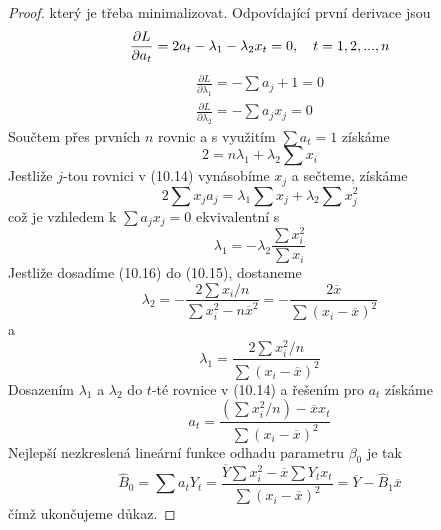 \begin{proof}
který je třeba minimalizovat. Odpovídající první derivace jsou
\begin{equation}
\frac{\partial L}{\partial a_t} = 2a_t - \lambda_1 - \lambda_2 x_t = 0, ~~~ t = 1, 2, ..., n\\
\end{equation}
\begin{gather*}
\frac{\partial L}{\partial \lambda_1} = - \sum a_j + 1 = 0\\
\frac{\partial L}{\partial \lambda_2} = - \sum a_j x_j = 0
\end{gather*}
Součtem přes prvních $n$ rovnic a s využitím $\sum a_t = 1$ získáme
\begin{equation}
2 = n \lambda_1 + \lambda_2 \sum x_i
\end{equation}
Jestliže $j$-tou rovnici v (10.14) vynásobíme $x_j$ a sečteme, získáme
\begin{equation*}
2 \sum x_j a_j = \lambda_1 \sum x_j + \lambda_2 \sum x_j^2
\end{equation*}
což je vzhledem k $\sum a_j x_j = 0$ ekvivalentní s
\begin{equation}
\lambda_1 = - \lambda_2 \frac{\sum x_i^2}{\sum x_i}
\end{equation}
Jestliže dosadíme (10.16) do (10.15), dostaneme
\begin{equation*}
\lambda_2 = - \frac{2 \sum x_i / n}{\sum x_i^2 - n \overline{x}^2} = - \frac{2 \overline{x}}{\sum(x_i - \overline{x})^2}
\end{equation*}
a
\begin{equation*}
\lambda_1 = \frac{2 \sum x_i^2 / n}{\sum (x_i - \overline{x})^2}
\end{equation*}
Dosazením $\lambda_1$ a $\lambda_2$ do $t$-té rovnice v (10.14) a řešením pro $a_t$ získáme
\begin{equation*}
a_t = \frac{(\sum x_i^2 / n) - \overline{x}x_t}{\sum(x_i - \overline{x})^2}
\end{equation*}
Nejlepší nezkreslená lineární funkce odhadu parametru $\beta_0$ je tak
\begin{equation*}
\hat{B}_0 = \sum a_t Y_t = \frac{\overline{Y} \sum x_i^2 - \overline{x}\sum Y_t x_t}{\sum (x_i - \overline{x})^2} = \overline{Y} - \hat{B}_1 \overline{x}
\end{equation*}
čímž ukončujeme důkaz.
\end{proof} 
